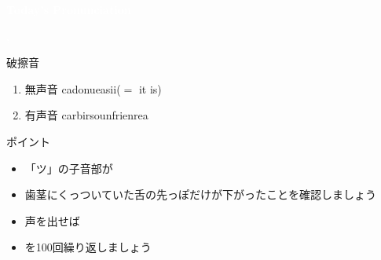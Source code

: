 \documentclass[aspectratio=169,xcolor={dvipsnames,table}]{beamer}
\begin{document}
\begin{frame}
\centering
  \textcolor{white}{\Huge\bfseries Today's Pronunciation}\pause

 \vspace{30pt}

  \textcolor{white}{\Huge\bfseries {}, }


\end{frame}
 \begin{frame}[plain]{破擦音\,\,\,}

\large

\begin{enumerate}
 \item  無声音 \hspace{20pt}ca\hspace{1\zw}donu\hspace{1\zw}ea\hspace{1\zw}si\hspace{1\zw}i($=$ it is)
 \item  有声音 \hspace{20pt}car\hspace{1\zw}bir\hspace{1\zw}soun\hspace{1\zw}frien\hspace{1\zw}rea
\end{enumerate}

\vspace*{20pt}

\normalsize
ポイント

\begin{itemize}
 \item 「ツ」の子音部が
 \item 歯茎にくっついていた舌の先っぽだけが下がったことを確認しましょう
 \item 声を出せば
 \item {}を100回繰り返しましょう
\end{itemize}
\hfill{}
\end{frame}
\end{document}
